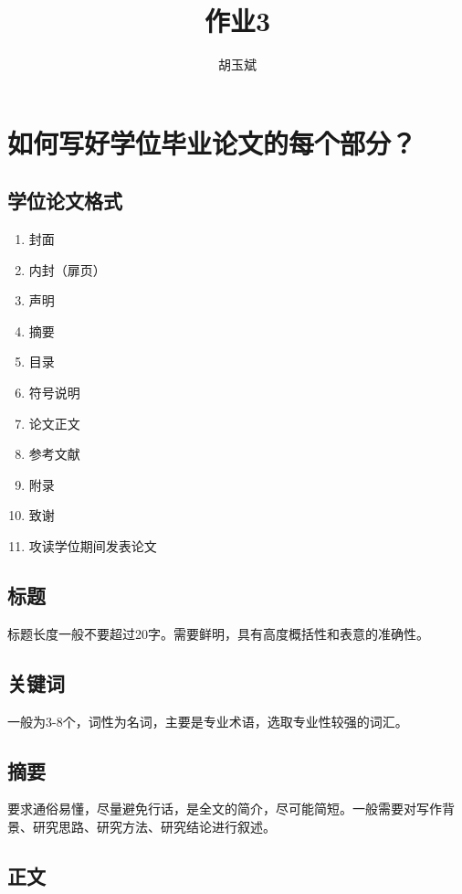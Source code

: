 \documentclass[onecolumn,oneside]{BUPTHomework}
\author{胡玉斌}
\title{作业3}
\begin{document}
  \maketitle

  \section*{如何写好学位毕业论文的每个部分？ }

  \subsection*{学位论文格式}
  \begin{enumerate}
    \item 封面
    \item 内封（扉页）
    \item 声明
    \item 摘要
    \item 目录
    \item 符号说明
    \item 论文正文
    \item 参考文献
    \item 附录
    \item 致谢
    \item 攻读学位期间发表论文
  \end{enumerate}

  \subsection*{标题}

  标题长度一般不要超过20字。需要鲜明，具有高度概括性和表意的准确性。

  \subsection*{关键词}

  一般为3-8个，词性为名词，主要是专业术语，选取专业性较强的词汇。

  \subsection*{摘要}

  要求通俗易懂，尽量避免行话，是全文的简介，尽可能简短。一般需要对写作背景、研究思路、研究方法、研究结论进行叙述。

  \subsection*{正文}
\end{document}
